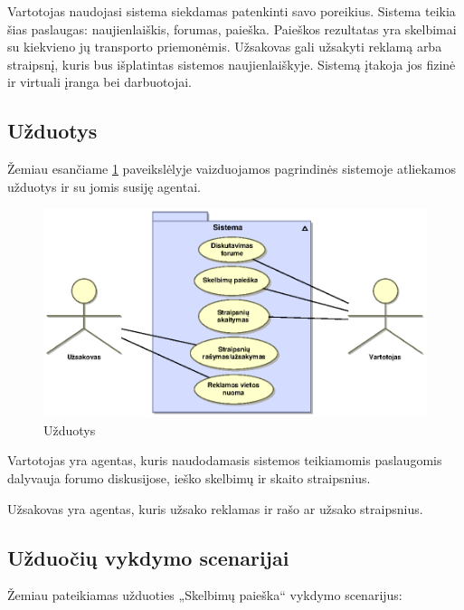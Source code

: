 \documentclass[12pt]{article}
\begin{document}
	Vartotojas naudojasi sistema siekdamas patenkinti savo poreikius. Sistema teikia šias paslaugas: naujienlaiškis, forumas, paieška. Paieškos rezultatas yra skelbimai su kiekvieno jų transporto priemonėmis. Užsakovas gali užsakyti reklamą arba straipsnį, kuris bus išplatintas sistemos naujienlaiškyje. Sistemą įtakoja jos fizinė ir virtuali įranga bei darbuotojai.
	\pagebreak
	
	\subsection{Užduotys}
	
	Žemiau esančiame \ref{UseCase3} paveikslėlyje vaizduojamos pagrindinės sistemoje atliekamos užduotys ir su jomis susiję agentai.
	
	\begin{figure}[h]
		\begin{center}
			\includegraphics[width=\textwidth]{AnalUzduotys.eps}
			\caption{Užduotys\label{UseCase3}}
		\end{center}
	\end{figure}
	
	Vartotojas yra agentas, kuris naudodamasis sistemos teikiamomis paslaugomis dalyvauja forumo diskusijose, ieško skelbimų ir skaito straipsnius.
	
	Užsakovas yra agentas, kuris užsako reklamas ir rašo ar užsako straipsnius.
	\pagebreak
	
	\subsection{Užduočių vykdymo scenarijai}
	
	Žemiau pateikiamas užduoties „Skelbimų paieška“ vykdymo scenarijus:
	
\end{document}
